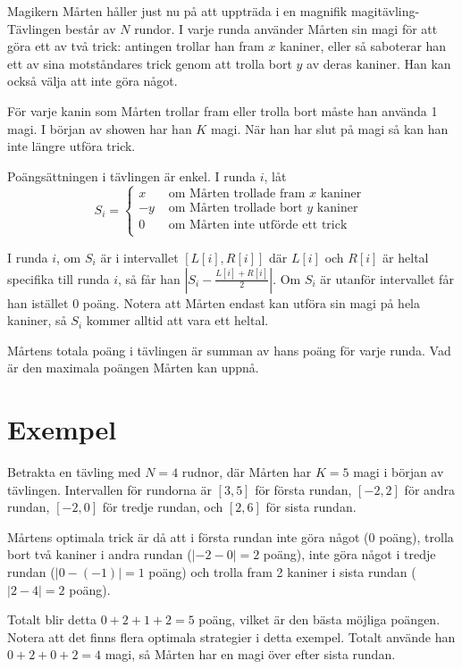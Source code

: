 \newcommand\version{v2}
Magikern Mårten håller just nu på att uppträda i en magnifik magitävling-
Tävlingen består av $N$ rundor.
I varje runda använder Mårten sin magi för att göra ett av två trick: antingen trollar
han fram $x$ kaniner, eller så saboterar han ett av sina motståndares trick genom att
trolla bort $y$ av deras kaniner. Han kan också välja att inte göra något.

För varje kanin som Mårten trollar fram eller trolla bort måste han använda 1 magi.
I början av showen har han $K$ magi. När han har slut på magi så kan han inte längre
utföra trick.

Poängsättningen i tävlingen är enkel. I runda $i$, låt
\[ S_i = \begin{cases}
  x & \text{ om Mårten trollade fram $x$ kaniner } \\
  -y & \text{ om Mårten trollade bort $y$ kaniner } \\
  0 & \text{ om Mårten inte utförde ett trick } \\
\end{cases}
\]

I runda $i$, om $S_i$ är i intervallet $[L[i], R[i]]$ där $L[i]$ och $R[i]$ är heltal specifika
till runda $i$, så får han $|S_i - \frac{L[i] + R[i]}{2}|$. Om $S_i$ är utanför intervallet
får han istället $0$ poäng. Notera att Mårten endast kan utföra sin magi på hela kaniner,
så $S_i$ kommer alltid att vara ett heltal.

Mårtens totala poäng i tävlingen är summan av hans poäng för varje runda.
Vad är den maximala poängen Mårten kan uppnå.

\section*{Exempel}
Betrakta en tävling med $N = 4$ rudnor, där Mårten har $K = 5$ magi i början av tävlingen.
Intervallen för rundorna är $[3, 5]$ för första rundan, $[-2, 2]$ för andra rundan, $[-2, 0]$ för tredje rundan,
och $[2, 6]$ för sista rundan.

Mårtens optimala trick är då att i första rundan inte göra något ($0$ poäng), trolla bort två kaniner i andra rundan ($|-2 - 0 | = 2$ poäng),
inte göra något i tredje rundan ($|0 - (-1)| = 1$ poäng) och trolla fram 2 kaniner i sista rundan ($|2 - 4| = 2$ poäng).

Totalt blir detta $0 + 2 + 1 + 2 = 5$ poäng, vilket är den bästa möjliga poängen. Notera att det finns flera optimala strategier i detta exempel.
Totalt använde han $0 + 2 + 0 + 2 = 4$ magi, så Mårten har en magi över efter sista rundan.

